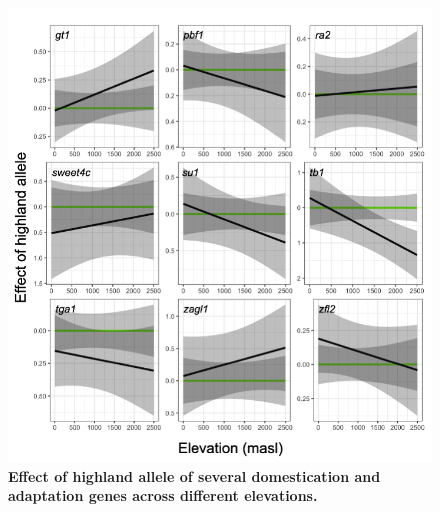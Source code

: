 \documentclass[9pt,twocolumn,twoside,lineno]{biorxiv}
\begin{document}
\begin{figure}[t]
\begin{center}
\includegraphics[width=0.8 \paperwidth]{Sup_Figures/Sup_Fig_13.png}
\caption{\textbf{Effect of highland allele of several domestication and adaptation genes across different elevations.}}
\label{figure:Sup:GxE_effect}
\end{center}
\end{figure} 
\end{document}
